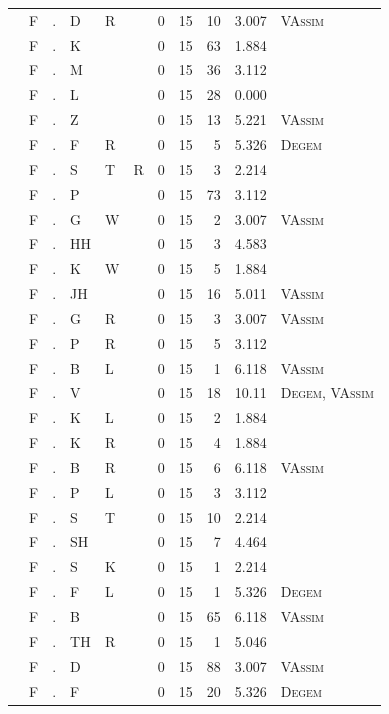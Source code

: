 \documentclass[12pt]{article}
\begin{document}
\begin{longtable}{r@{ } r@{ } c@{ } l@{ } l@{ } l@{ } r r r r l }
 & F & . & D & R &  & 0 & 15 & 10 & 3.007 & \textsc{VAssim} \\
 & F & . & K &  &  & 0 & 15 & 63 & 1.884 &  \\
 & F & . & M &  &  & 0 & 15 & 36 & 3.112 &  \\
 & F & . & L &  &  & 0 & 15 & 28 & 0.000 &  \\
 & F & . & Z &  &  & 0 & 15 & 13 & 5.221 & \textsc{VAssim} \\
 & F & . & F & R &  & 0 & 15 & 5 & 5.326 & \textsc{Degem} \\
 & F & . & S & T & R & 0 & 15 & 3 & 2.214 &  \\
 & F & . & P &  &  & 0 & 15 & 73 & 3.112 &  \\
 & F & . & G & W &  & 0 & 15 & 2 & 3.007 & \textsc{VAssim} \\
 & F & . & HH &  &  & 0 & 15 & 3 & 4.583 &  \\
 & F & . & K & W &  & 0 & 15 & 5 & 1.884 &  \\
 & F & . & JH &  &  & 0 & 15 & 16 & 5.011 & \textsc{VAssim} \\
 & F & . & G & R &  & 0 & 15 & 3 & 3.007 & \textsc{VAssim} \\
 & F & . & P & R &  & 0 & 15 & 5 & 3.112 &  \\
 & F & . & B & L &  & 0 & 15 & 1 & 6.118 & \textsc{VAssim} \\
 & F & . & V &  &  & 0 & 15 & 18 & 10.11 & \textsc{Degem}, \textsc{VAssim} \\
 & F & . & K & L &  & 0 & 15 & 2 & 1.884 &  \\
 & F & . & K & R &  & 0 & 15 & 4 & 1.884 &  \\
 & F & . & B & R &  & 0 & 15 & 6 & 6.118 & \textsc{VAssim} \\
 & F & . & P & L &  & 0 & 15 & 3 & 3.112 &  \\
 & F & . & S & T &  & 0 & 15 & 10 & 2.214 &  \\
 & F & . & SH &  &  & 0 & 15 & 7 & 4.464 &  \\
 & F & . & S & K &  & 0 & 15 & 1 & 2.214 &  \\
 & F & . & F & L &  & 0 & 15 & 1 & 5.326 & \textsc{Degem} \\
 & F & . & B &  &  & 0 & 15 & 65 & 6.118 & \textsc{VAssim} \\
 & F & . & TH & R &  & 0 & 15 & 1 & 5.046 &  \\
 & F & . & D &  &  & 0 & 15 & 88 & 3.007 & \textsc{VAssim} \\
 & F & . & F &  &  & 0 & 15 & 20 & 5.326 & \textsc{Degem} \\

\end{longtable}
\end{document}
